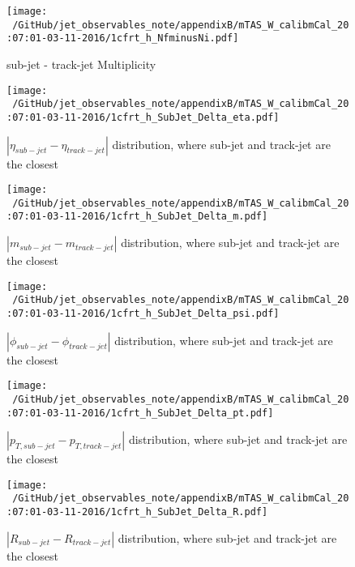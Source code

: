 \begin{figure}
 
\texttt{[image: ~/GitHub/jet\_observables\_note/appendixB/mTAS\_W\_calibmCal\_20:07:01-03-11-2016/1cfrt\_h\_NfminusNi.pdf]}
\caption{sub-jet - track-jet Multiplicity}
 
\end{figure}

\clearpage

\begin{figure}
 
\texttt{[image: ~/GitHub/jet\_observables\_note/appendixB/mTAS\_W\_calibmCal\_20:07:01-03-11-2016/1cfrt\_h\_SubJet\_Delta\_eta.pdf]}
\caption{$| \eta_{sub-jet} - \eta_{track-jet} | $ distribution, where sub-jet and track-jet are the closest}
 
\end{figure}
 
\begin{figure}
 
\texttt{[image: ~/GitHub/jet\_observables\_note/appendixB/mTAS\_W\_calibmCal\_20:07:01-03-11-2016/1cfrt\_h\_SubJet\_Delta\_m.pdf]}
\caption{$| m_{sub-jet} - m_{track-jet} |$ distribution, where sub-jet and track-jet are the closest}
 
\end{figure}
 
\begin{figure}
 
\texttt{[image: ~/GitHub/jet\_observables\_note/appendixB/mTAS\_W\_calibmCal\_20:07:01-03-11-2016/1cfrt\_h\_SubJet\_Delta\_psi.pdf]}
\caption{$| \phi_{sub-jet} - \phi_{track-jet} | $ distribution, where sub-jet and track-jet are the closest}
 
\end{figure}
\begin{figure}
 
\texttt{[image: ~/GitHub/jet\_observables\_note/appendixB/mTAS\_W\_calibmCal\_20:07:01-03-11-2016/1cfrt\_h\_SubJet\_Delta\_pt.pdf]}
\caption{$| p_{T,sub-jet} - p_{T,track-jet} | $ distribution, where sub-jet and track-jet are the closest}
 
\end{figure}
 
\begin{figure}
 
\texttt{[image: ~/GitHub/jet\_observables\_note/appendixB/mTAS\_W\_calibmCal\_20:07:01-03-11-2016/1cfrt\_h\_SubJet\_Delta\_R.pdf]}
\caption{$| R_{sub-jet} - R_{track-jet} | $ distribution, where sub-jet and track-jet are the closest}
 
\end{figure}
 
